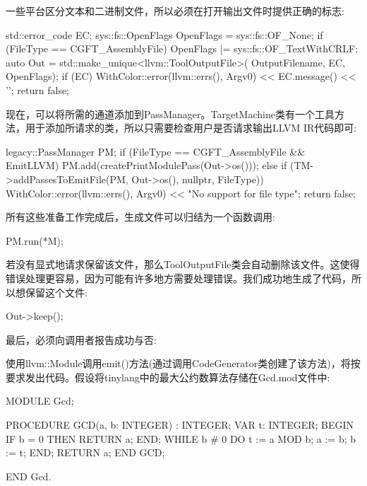 一些平台区分文本和二进制文件，所以必须在打开输出文件时提供正确的标志:

\begin{cpp}
std::error_code EC;
sys::fs::OpenFlags OpenFlags = sys::fs::OF_None;
if (FileType == CGFT_AssemblyFile)
    OpenFlags |= sys::fs::OF_TextWithCRLF;
auto Out = std::make_unique<llvm::ToolOutputFile>(
    OutputFilename, EC, OpenFlags);
if (EC) {
    WithColor::error(llvm::errs(), Argv0)
        << EC.message() << '\n';
    return false;
}
\end{cpp}

现在，可以将所需的通道添加到PassManager。TargetMachine类有一个工具方法，用于添加所请求的类，所以只需要检查用户是否请求输出LLVM IR代码即可:

\begin{cpp}
    legacy::PassManager PM;
    if (FileType == CGFT_AssemblyFile && EmitLLVM) {
        PM.add(createPrintModulePass(Out->os()));
    } else {
        if (TM->addPassesToEmitFile(PM, Out->os(), nullptr,
                                    FileType)) {
            WithColor::error(llvm::errs(), Argv0)
                << "No support for file type\n";
            return false;
        }
    }
\end{cpp}

所有这些准备工作完成后，生成文件可以归结为一个函数调用:

\begin{cpp}
PM.run(*M);
\end{cpp}

若没有显式地请求保留该文件，那么ToolOutputFile类会自动删除该文件。这使得错误处理更容易，因为可能有许多地方需要处理错误。我们成功地生成了代码，所以想保留这个文件:

\begin{cpp}
Out->keep();
\end{cpp}

最后，必须向调用者报告成功与否:

\begin{cpp}
    return true;
}
\end{cpp}

使用llvm::Module调用emit()方法(通过调用CodeGenerator类创建了该方法)，将按要求发出代码。假设将tinylang中的最大公约数算法存储在Gcd.mod文件中:

\begin{shell}
MODULE Gcd;

PROCEDURE GCD(a, b: INTEGER) : INTEGER;
VAR t: INTEGER;
BEGIN
    IF b = 0 THEN
        RETURN a;
    END;
    WHILE b # 0 DO
    t := a MOD b;
    a := b;
    b := t;
    END;
    RETURN a;
END GCD;

END Gcd.
\end{shell}

